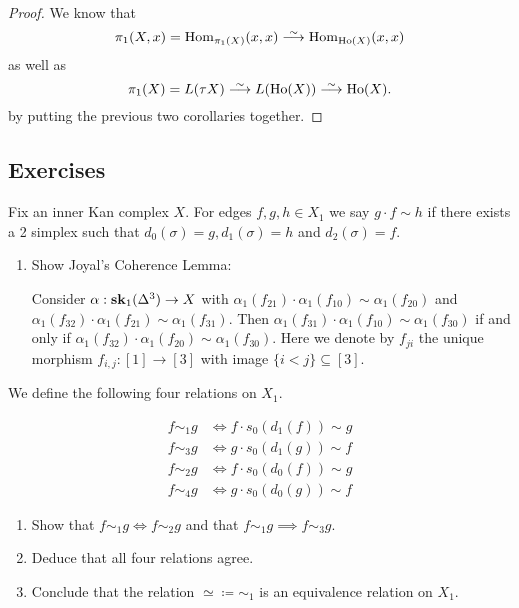 \begin{proof}
    We know that 
    \[
    \pi_1(X,x) = \Hom_{\pi_1(X)}(x,x) \isomorphism \Hom_{\Ho(X)}(x,x)
    \]
    as well as 
    \[
    \pi_1(X)=L(\tau X) \isomorphism L(\Ho(X)) \isomorphism \Ho(X).
    \]
    by putting the previous two corollaries together.
\end{proof}

\subsection{Exercises}

\begin{Exercise}
    Fix an inner Kan complex $ X $. For edges $ f , g , h \in X_1 $ we say $ g \cdot f \sim h $ if there exists a 2 simplex such that $d_0 ( \sigma ) = g , d_1 ( \sigma ) = h $ and $ d_2 ( \sigma ) = f $.
    
    \begin{enumerate}
        \item 
        Show Joyal's Coherence Lemma:
    
        Consider $ \alpha: \bold{sk}_1 ( \Delta^3 ) \to X $ with $ \alpha_1 ( f_{21} ) \cdot \alpha_1 ( f_{10} ) \sim \alpha_1 ( f_{20} ) $ and $ \alpha_1 ( f_{32} ) \cdot \alpha_1 ( f_{21} ) \sim \alpha_1 ( f_{31} )$.
        Then $ \alpha_1 ( f_{31} ) \cdot \alpha_1 ( f_{10} ) \sim \alpha_1 ( f_{30} )$ if and only if $ \alpha_1 ( f_{32} ) \cdot \alpha_1 ( f_{20} ) \sim \alpha_1 ( f_{30} ) $.
        Here we denote by $ f_{ji} $ the unique morphism $ f_{ i , j } : [1 ] \to [ 3 ]$ with image $ \{ i < j \} \subseteq [ 3 ] $.
    \end{enumerate}
    
    We define the following four relations on $X_1$.
    
    \begin{align*}
        f \sim_1 g & \iff f \cdot s_0 ( d_1 ( f ) ) \sim g 
        \\
        f \sim_3 g & \iff g \cdot s_0 ( d_1 ( g ) ) \sim f
    \end{align*}
    \qquad
    \begin{align*}
        f \sim_2 g & \iff f \cdot s_0 ( d_0 ( f ) ) \sim g 
        \\
        f \sim_4 g & \iff g \cdot s_0 ( d_0 ( g ) ) \sim f
    \end{align*}
    
    \begin{enumerate}[label=(\alph*), resume]
        \item 
        Show that $ f \sim_1 g \iff f \sim_2 g $ and that $ f \sim_1 g \implies f \sim_3 g $.
    
        \item 
        Deduce that all four relations agree.
    
        \item 
        Conclude that the relation $ \simeq \coloneqq \sim_1 $ is an equivalence relation on $X_1$.
    \end{enumerate}
\end{Exercise}

